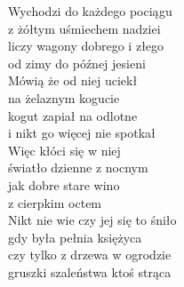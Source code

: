 
\begin{flushleft}
Wychodzi do każdego pociągu \tab{}  \\
z żółtym uśmiechem nadziei \tab{}  \\
liczy wagony dobrego i złego \tab{} \\
od zimy do późnej jesieni \tab{} \\
\vskip 3mm
Mówią że od niej uciekł  \\
na żelaznym kogucie  \\
kogut zapiał na odlotne  \\
i nikt go więcej nie spotkał  \\
\vskip 3mm
Więc kłóci się w niej  \\
światło dzienne z nocnym  \\
jak dobre stare wino  \\
z cierpkim octem  \\
\vskip 3mm
Nikt nie wie czy jej się to śniło  \\
gdy była pełnia księżyca  \\
czy tylko z drzewa w ogrodzie  \\
gruszki szaleństwa ktoś strąca  \\
\end{flushleft}
\clearpage